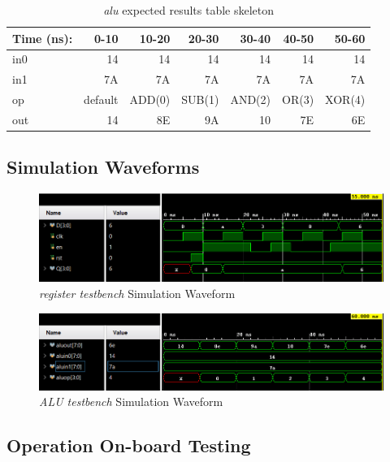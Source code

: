 \documentclass[11pt]{article}
\begin{document}
\begin{table}[ht]\centering
	\caption{\textit{alu} expected results table skeleton}
	\label{ALU:tbl:alu_ERT}\medskip
	\begin{tabular}{l|rrrrrr}
		Time (ns): & 0-10 & 10-20 & 20-30 & 30-40 & 40-50 & 50-60 \\
		\midrule
		in0 & 14  & 14 & 14 & 14 & 14 & 14 \\
		in1 & 7A & 7A & 7A & 7A & 7A & 7A \\
		op    & default & ADD(0) & SUB(1) & AND(2) & OR(3) & XOR(4) \\
		\midrule
		out & 14 & 8E & 9A & 10 & 7E & 6E \\
		\bottomrule
	\end{tabular}
\end{table}
\clearpage

\subsection*{Simulation Waveforms}
\begin{figure}[ht]\centering
	\includegraphics[width=1\textwidth]{register_test}
	\caption{\textit{register testbench} Simulation Waveform}
	\label{fig:sim_with_table}
\end{figure}

\begin{figure}[ht]\centering
	\includegraphics[width=1\textwidth]{alu_test}
	\caption{\textit{ALU testbench} Simulation Waveform}
	\label{fig:sim_with_table}
\end{figure}
\clearpage

\subsection*{Operation On-board Testing}
\end{document}
